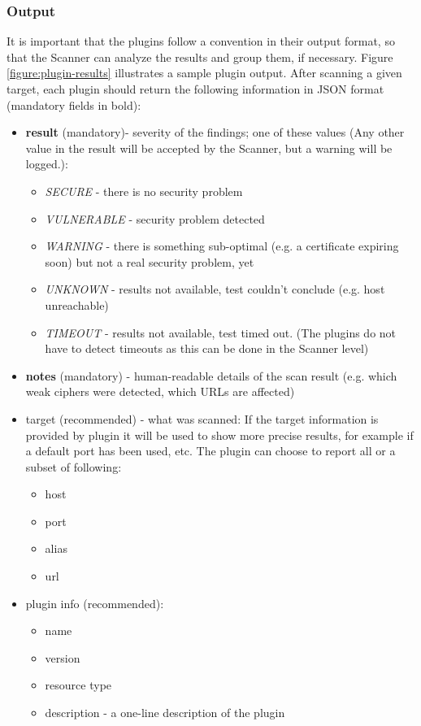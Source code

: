 \subsubsection{Output}
It is important that the plugins follow a convention in their output format, so that the Scanner can analyze the results and group them, if necessary. Figure \ref{figure:plugin-results} illustrates a sample plugin output. After scanning a given target, each plugin should return the following information in JSON format (mandatory fields in bold): 
\begin{itemize}


   \item \textbf{result} (mandatory)- severity of the findings; one of these values (Any other value in the result will be accepted by the Scanner, but a warning will be logged.):
    \begin{itemize}
    

        \item \textit{SECURE} - there is no security problem
        \item  \textit{VULNERABLE} - security problem detected
        \item  \textit{WARNING} - there is something sub-optimal (e.g. a certificate expiring soon) but not a real security problem, yet
        \item  \textit{UNKNOWN} - results not available, test couldn't conclude (e.g. host unreachable)
        \item  \textit{TIMEOUT} - results not available, test timed out. (The plugins do not have to detect timeouts as this can be done in the Scanner level) 
            \end{itemize}
\item      \textbf{notes} (mandatory) - human-readable details of the scan result (e.g. which weak ciphers were detected, which URLs are affected)
\item      target (recommended) - what was scanned: If the target information is provided by plugin it will be used to show more precise results, for example if a default port has been used, etc. The plugin can choose to report all or a subset of following:
\begin{itemize}


\item        host
\item    port
\item    alias
\item    url 
\end{itemize}
\item    plugin info (recommended):
\begin{itemize}
\item        name
\item        version
\item    resource type
\item    description - a one-line description of the plugin 
\end{itemize}
\end{itemize}

